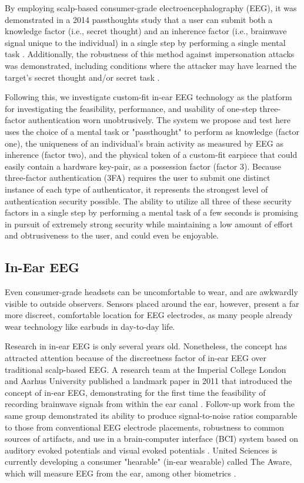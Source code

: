 \documentclass{sigchi}
\begin{document}
By employing scalp-based consumer-grade electroencephalography (EEG), it was demonstrated in a 2014 passthoughts study that a user can submit both a knowledge factor (i.e., secret thought) and an inherence factor (i.e., brainwave signal unique to the individual) in a single step by performing a single mental task \cite{Chuang2014}. Additionally, the robustness of this method against impersonation attacks was demonstrated, including conditions where the attacker may have learned the target's secret thought and/or secret task \cite{Johnson2014}.

Following this, we investigate custom-fit in-ear EEG technology as the platform for investigating the feasibility, performance, and usability of one-step three-factor authentication worn unobtrusively. The system we propose and test here uses the choice of a mental task or "passthought" to perform as knowledge (factor one), the uniqueness of an individual's brain activity as measured by EEG as inherence (factor two), and the physical token of a custom-fit earpiece that could easily contain a hardware key-pair, as a possession factor (factor 3). Because three-factor authentication (3FA) requires the user to submit one distinct instance of each type of authenticator, it represents the strongest level of authentication security possible. The ability to utilize all three of these security factors in a single step by performing a mental task of a few seconds is promising in pursuit of extremely strong security while maintaining a low amount of effort and obtrusiveness to the user, and could even be enjoyable.

\subsection{In-Ear EEG}
Even consumer-grade headsets can be uncomfortable to wear, and are awkwardly visible to outside observers. Sensors placed around the ear, however, present a far more discreet, comfortable location for EEG electrodes, as many people already wear technology like earbuds in day-to-day life.

Research in in-ear EEG is only several years old. Nonetheless, the concept has
attracted attention because of the discreetness factor of in-ear EEG over
traditional scalp-based EEG. A research team at the Imperial College London
and Aarhus University published a landmark paper in 2011 that introduced the
concept of in-ear EEG, demonstrating for the first time the feasibility of recording
brainwave signals from within the ear canal \cite{Looney2011}.
Follow-up work from the same group demonstrated its ability to produce signal-to-noise ratios comparable to
those from conventional EEG electrode placements, robustness to common
sources of artifacts, and use in a brain-computer interface (BCI) system based on
auditory evoked potentials and visual evoked potentials
\cite{Looney2012a,Kidmose2013a,Kidmose2013b}.
United Sciences is currently developing a consumer "hearable" (in-ear wearable) called The Aware, which will measure EEG from the ear, among other biometrics \cite{UnitedSciences}.
\end{document}
